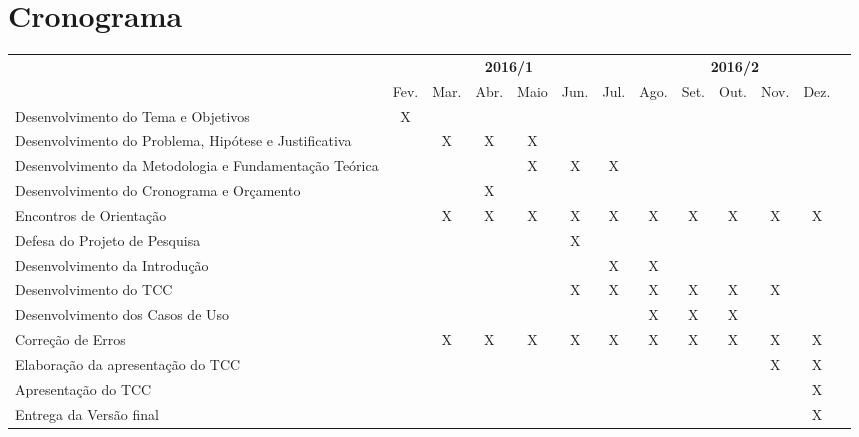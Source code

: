 \section{Cronograma}\label{lcronograma}

\begin{adjustbox}{center}
  \tiny
  \begin{tabular}{|p{4cm}|c|c|c|c|c|c|c|c|c|c|c|l|}
    \cline{1-12}
      \multicolumn{1}{|c|}{
        \multirow{2}{*}{
          \diagbox[width=4.4cm]{
            \textbf{Atividades}
          }{
            \textbf{Ano/Mês}
          }}}
      & \multicolumn{6}{c|}{\textbf{2016/1}}
      & \multicolumn{5}{c|}{\textbf{2016/2}} \\
      \cline{2-12}
      & Fev. & Mar. & Abr. & Maio & Jun. & Jul. & Ago. & Set. & Out. & Nov. & Dez. \\
    \hline
      Desenvolvimento do Tema e Objetivos
      & X &  &  &  &  &  &  &  &  &  &  \\
    \hline
      Desenvolvimento do Problema, Hipótese e Justificativa
      & & X & X & X &  &  &  &  &  &  &  \\
    \hline
      Desenvolvimento da Metodologia e Fundamentação Teórica
      & & & & X & X & X & & & & & \\
    \hline
      Desenvolvimento do Cronograma e Orçamento
      & & & X & & & & & & & & \\
    \hline
      Encontros de Orientação
      & & X & X & X & X & X & X & X & X & X & X \\
    \hline
      Defesa do Projeto de Pesquisa
      & & & & & X & & & & & & \\
    \hline
      Desenvolvimento da Introdução
      & & & & & & X & X & & & & \\
    \hline
      Desenvolvimento do TCC
      & & & & & X & X & X & X & X & X & \\
    \hline
      Desenvolvimento dos Casos de Uso
      & & & & & & & X & X & X & & \\
    \hline
      Correção de Erros
      & & X & X & X & X & X & X & X & X & X & X \\
    \hline
      Elaboração da apresentação do TCC
      & & & & & & & & & & X & X \\
    \hline
      Apresentação do TCC
      & & & & & & & & & & & X \\
    \hline
      Entrega da Versão final
      & & & & & & & & & & & X \\
    \hline
  \end{tabular}
\end{adjustbox}
